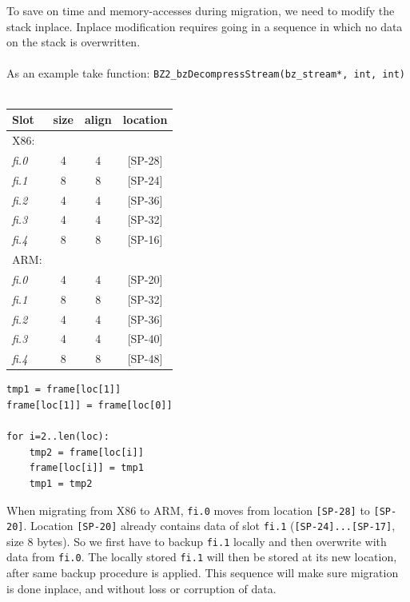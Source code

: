 \documentclass[a4paper]{article}
\begin{document}
To save on time and memory-accesses during migration, we need to modify the stack inplace.
Inplace modification requires going in a sequence in which no data on the stack is overwritten.
\\
\\
As an example take function: \texttt{BZ2\_bzDecompressStream(bz\_stream*, int, int)}
\\
\\
\begin{minipage}[t]{0.5\textwidth}
\begin{tabular}{lccc}
\textbf{Slot} & \textbf{size} & \textbf{align} & \textbf{location} \\
\hline
X86: & & & \\
\hline
  \textit{fi.0} & 4 & 4 & [SP-28] \\
  \textit{fi.1} & 8 & 8 & [SP-24] \\
  \textit{fi.2} & 4 & 4 & [SP-36] \\
  \textit{fi.3} & 4 & 4 & [SP-32] \\
  \textit{fi.4} & 8 & 8 & [SP-16] \\
\hline
ARM: & & & \\
\hline
  \textit{fi.0} & 4 & 4 & [SP-20] \\
  \textit{fi.1} & 8 & 8 & [SP-32] \\
  \textit{fi.2} & 4 & 4 & [SP-36] \\
  \textit{fi.3} & 4 & 4 & [SP-40] \\
  \textit{fi.4} & 8 & 8 & [SP-48] \\
\end{tabular}
\end{minipage}
\begin{minipage}[t]{0.5\textwidth}
\centering
\begin{lstlisting}
tmp1 = frame[loc[1]]
frame[loc[1]] = frame[loc[0]]

for i=2..len(loc):
    tmp2 = frame[loc[i]]
    frame[loc[i]] = tmp1
    tmp1 = tmp2
\end{lstlisting}
\end{minipage}

When migrating from X86 to ARM, \texttt{fi.0} moves from location \texttt{[SP-28]} to \texttt{[SP-20]}.
Location \texttt{[SP-20]} already contains data of slot \texttt{fi.1} (\texttt{[SP-24]...[SP-17]}, size 8 bytes).
So we first have to backup \texttt{fi.1} locally and then overwrite with data from \texttt{fi.0}.
The locally stored \texttt{fi.1} will then be stored at its new location, after same backup procedure is applied.
This sequence will make sure migration is done inplace, and without loss or corruption of data.
\end{document}
